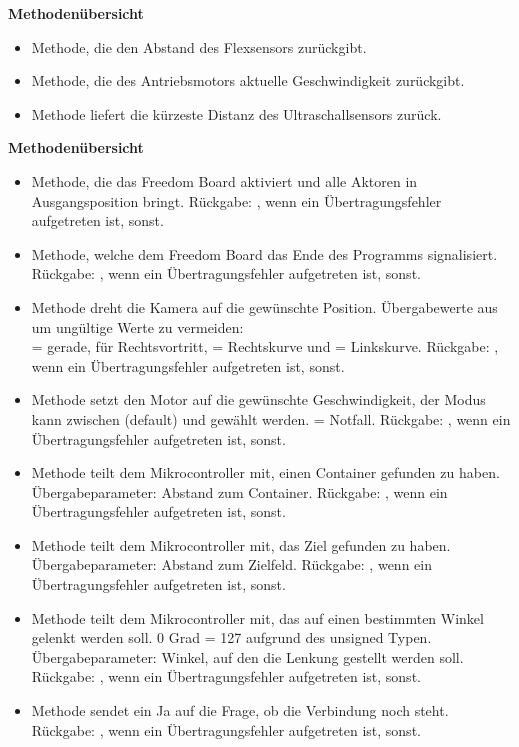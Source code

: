 \textbf{Methodenübersicht }
\begin{itemize}
\item {} Methode, die den Abstand des Flexsensors zurückgibt.
\item {} Methode, die des Antriebsmotors aktuelle Geschwindigkeit zurückgibt.
\item {} Methode liefert die kürzeste Distanz des Ultraschallsensors zurück.
\end{itemize}
\textbf{Methodenübersicht }
\begin{itemize}
\item {} Methode, die das Freedom Board aktiviert und alle Aktoren in Ausgangsposition bringt. Rückgabe: , wenn ein Übertragungsfehler aufgetreten ist,  sonst.
%
\item {} Methode, welche dem Freedom Board das Ende des Programms signalisiert.  Rückgabe: , wenn ein Übertragungsfehler aufgetreten ist,  sonst.
%
\item {} Methode dreht die Kamera auf die gewünschte Position. Übergabewerte aus  um ungültige Werte zu vermeiden:\\
 = gerade,  für Rechtsvortritt,  = Rechtskurve und  = Linkskurve. Rückgabe: , wenn ein Übertragungsfehler aufgetreten ist,  sonst.
%
\item {} Methode setzt den Motor auf die gewünschte Geschwindigkeit, der Modus kann zwischen  (default) und  gewählt werden.  = Notfall. Rückgabe: , wenn ein Übertragungsfehler aufgetreten ist,  sonst.
%
\item {} Methode teilt dem Mikrocontroller mit, einen Container gefunden zu haben. Übergabeparameter: Abstand zum Container. Rückgabe: , wenn ein Übertragungsfehler aufgetreten ist,  sonst.
%
\item {}  Methode teilt dem Mikrocontroller mit, das Ziel gefunden zu haben. Übergabeparameter: Abstand zum Zielfeld. Rückgabe: , wenn ein Übertragungsfehler aufgetreten ist,  sonst.
%
\item {}  Methode teilt dem Mikrocontroller mit, das auf einen bestimmten Winkel gelenkt werden soll. 0 Grad = 127 aufgrund des unsigned Typen. Übergabeparameter: Winkel, auf den die Lenkung gestellt werden soll. Rückgabe: , wenn ein Übertragungsfehler aufgetreten ist,  sonst.
%
\item {} Methode sendet ein Ja auf die Frage, ob die Verbindung noch steht.  Rückgabe: , wenn ein Übertragungsfehler aufgetreten ist,  sonst.
\end{itemize}